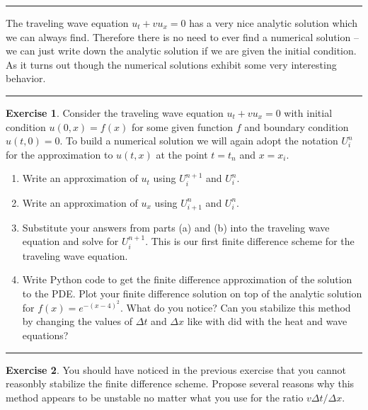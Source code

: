\documentclass[
]{book}
\providecommand{\tightlist}{%
  \setlength{\itemsep}{0pt}\setlength{\parskip}{0pt}}
\theoremstyle{definition}
\theoremstyle{definition}
\theoremstyle{definition}
\newtheorem{exercise}{Exercise}[chapter]
\theoremstyle{remark}
\begin{document}
\begin{center}\rule{0.5\linewidth}{0.5pt}\end{center}

The traveling wave equation \(u_t + vu_x = 0\) has a very nice analytic solution which we can always find. Therefore there is no need to ever find a numerical solution -- we can just write down the analytic solution if we are given the initial condition. As it turns out though the numerical solutions exhibit some very interesting behavior.

\begin{center}\rule{0.5\linewidth}{0.5pt}\end{center}

\begin{exercise}
\protect\hypertarget{exr:unnamed-chunk-589}{}{\label{exr:unnamed-chunk-589} }Consider the traveling wave equation \(u_t + vu_x = 0\) with initial condition \(u(0,x) = f(x)\) for some given function \(f\) and boundary condition \(u(t,0) = 0\). To build a numerical solution we will again adopt the notation \(U_i^n\) for the approximation to \(u(t,x)\) at the point \(t=t_n\) and \(x=x_i\).

\begin{enumerate}
\def\labelenumi{\alph{enumi}.}
\tightlist
\item
  Write an approximation of \(u_t\) using \(U_i^{n+1}\) and \(U_i^n\).
\item
  Write an approximation of \(u_x\) using \(U_{i+1}^n\) and \(U_i^n\).
\item
  Substitute your answers from parts (a) and (b) into the traveling wave equation and solve for \(U_i^{n+1}\). This is our first finite difference scheme for the traveling wave equation.\\
\item
  Write Python code to get the finite difference approximation of the solution to the PDE. Plot your finite difference solution on top of the analytic solution for \(f(x) = e^{-(x-4)^2}\). What do you notice? Can you stabilize this method by changing the values of \(\Delta t\) and \(\Delta x\) like with did with the heat and wave equations?
\end{enumerate}
\end{exercise}

\begin{center}\rule{0.5\linewidth}{0.5pt}\end{center}

\begin{exercise}
\protect\hypertarget{exr:unnamed-chunk-590}{}{\label{exr:unnamed-chunk-590} }You should have noticed in the previous exercise that you cannot reasonbly stabilize the finite difference scheme. Propose several reasons why this method appears to be unstable no matter what you use for the ratio \(v \Delta t / \Delta x\).
\end{exercise}
\end{document}
